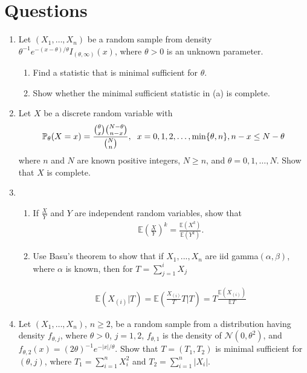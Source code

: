 \documentclass[12pt]{extarticle}
\newcommand{\p}{\mathbb P}
\newcommand{\E}{\mathbb E}
\begin{document}
\section{Questions}
\begin{enumerate}
		\item Let $(X_1,\ldots, X_n) $ be a random sample from density $\theta^{-1}e^{-(x-\theta)/\theta}I_{(\theta, \infty)}(x)$, where $\theta >0 $ is an unknown parameter.
		

	\begin{enumerate}
		\item Find a statistic that is minimal sufficient for $\theta$.
		\item Show whether the minimal sufficient statistic in (a) is complete.
	\end{enumerate}
		\vspace{2cm}
	\item Let $X$ be a discrete random variable with $$\p_\theta(X = x) = \dfrac{{\theta\choose x}{N-\theta \choose n-x}}{{N \choose n}},\hspace{.2cm}x = 0,1,2,\ldots,\min\{\theta,n\}, n-x \leq N-\theta$$ where $n$ and $N$ are known positive integers, $N\geq n$, and $\theta = 0, 1, \ldots,N$. Show that $X$ is complete.


	\vspace{2cm}

	\item\begin{enumerate}
	\item If $\frac{X}{Y}$ and $Y$ are independent random variables, show that 
	\begin{align*}
	\E \left (\frac{X}{Y} \right )^k = \frac{\E(X^k)}{\E(Y^k)}.
	\end{align*}
	
	\item Use Basu's theorem to show that if $X_1, ..., X_n$ are iid gamma$(\alpha,\beta)$, where $\alpha$ is known, then for $T=\sum_{j=1}^{i} X_j$
	
	\begin{align*}
	\E(X_{(i)}|T)=\E \left( \frac{X_{(i)}}{T} T |T   \right) = T \frac{\E(X_{(i)})}{\E T} 
	\end{align*}
	
\end{enumerate} 
	\vspace{2cm}


\item Let $(X_1 , \ldots, X_n)$, $n \geq 2$, be a random sample from a distribution having density $f_{\theta,j}$, where $\theta > 0$, $j = 1, 2$, $f_{\theta,1}$ is the density of $\mathcal N(0, \theta^2 )$, and $f_{\theta,2}(x)=(2\theta)^{-1}e^ {-|x|/\theta}$. Show that $T = (T_1 , T_2 )$ is minimal sufficient for $(\theta, j)$, where $T_1 =\sum_{i=1}^n X_i^2$ and $T_2 = \sum_{i=1}^n |X_i |$.
\end{enumerate}
\end{document}
